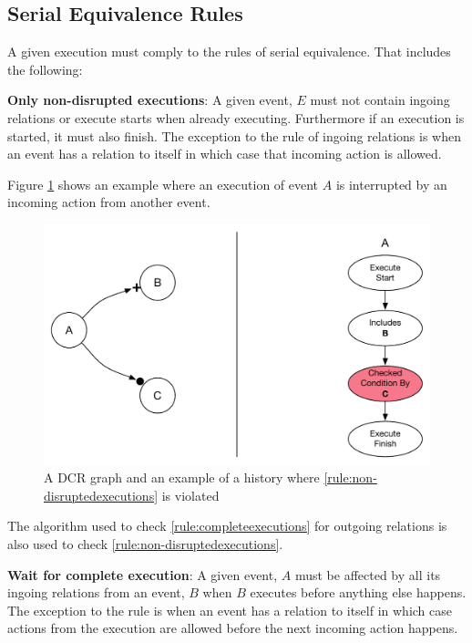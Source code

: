 	\subsection{Serial Equivalence Rules}
	A given execution must comply to the rules of serial equivalence. That includes the following:
	
	\begin{ruledef}
		\textbf{Only non-disrupted executions}: A given event, $E$ must not contain ingoing relations or execute starts when already executing. Furthermore if an execution is started, it must also finish. The exception to the rule of ingoing relations is when an event has a relation to itself in which case that incoming action is allowed.
		\label{rule:non-disruptedexecutions}
	\end{ruledef}
	
	\noindent Figure \ref{fig:validation:only-non-disrupted-executions} shows an example where an execution of event $A$ is interrupted by an incoming action from another event.
	
	\begin{figure}[H]
		\centering
		\includegraphics[width=.7\textwidth]{5validation/images/only-nondisrupted-executions.pdf}
		\caption{A DCR graph and an example of a history where \autoref{rule:non-disruptedexecutions} is violated}
		\label{fig:validation:only-non-disrupted-executions}
	\end{figure}
		
	\noindent The algorithm used to check \autoref{rule:completeexecutions} for outgoing relations is also used to check \autoref{rule:non-disruptedexecutions}.
	
	\begin{ruledef}
		\textbf{Wait for complete execution}: A given event, $A$ must be affected by all its ingoing relations from an event, $B$ when $B$ executes before anything else happens. The exception to the rule is when an event has a relation to itself in which case actions from the execution are allowed before the next incoming action happens. 
		\label{rule:wait-for-complete-execution}
	\end{ruledef}
	
